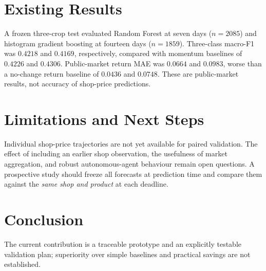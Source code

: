 \documentclass[11pt,a4paper]{article}
\begin{document}
\section{Existing Results}
A frozen three-crop test evaluated Random Forest at seven days (\(n=2085\)) and histogram gradient boosting at fourteen days (\(n=1859\)). Three-class macro-F1 was \(0.4218\) and \(0.4169\), respectively, compared with momentum baselines of \(0.4226\) and \(0.4306\). Public-market return MAE was \(0.0664\) and \(0.0983\), worse than a no-change return baseline of \(0.0436\) and \(0.0748\). These are public-market results, not accuracy of shop-price predictions.

\section{Limitations and Next Steps}
Individual shop-price trajectories are not yet available for paired validation. The effect of including an earlier shop observation, the usefulness of market aggregation, and robust autonomous-agent behaviour remain open questions. A prospective study should freeze all forecasts at prediction time and compare them against the \emph{same shop and product} at each deadline.

\section{Conclusion}
The current contribution is a traceable prototype and an explicitly testable validation plan; superiority over simple baselines and practical savings are not established.



\end{document}
